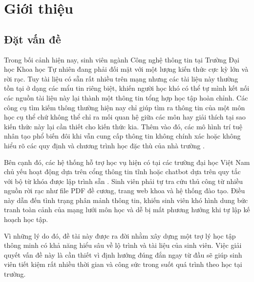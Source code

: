 \chapter{Giới thiệu}
\label{Chapter1}



\section{Đặt vấn đề}

Trong bối cảnh hiện nay, sinh viên ngành Công nghệ thông tin tại Trường Đại học Khoa học Tự nhiên đang phải đối mặt với một lượng kiến thức cực kỳ lớn và rời rạc. Tuy tài liệu có sẵn rất nhiều trên mạng nhưng các tài liệu này thường tồn tại ở dạng các mẩu tin riêng biệt, khiến người học khó có thể tự mình kết nối các nguồn tài liệu này lại thành một thông tin tổng hợp học tập hoàn chỉnh. Các công cụ tìm kiếm thông thường hiện nay chỉ giúp tìm ra thông tin của một môn học cụ thể chứ không thể chỉ ra mối quan hệ giữa các môn hay giải thích tại sao kiến thức này lại cần thiết cho kiến thức kia. Thêm vào đó, các mô hình trí tuệ nhân tạo phổ biến đôi khi vẫn cung cấp thông tin không chính xác hoặc không hiểu rõ các quy định và chương trình học đặc thù của nhà trường \cite{ji2023survey}.

Bên cạnh đó, các hệ thống hỗ trợ học vụ hiện có tại các trường đại học Việt Nam chủ yếu hoạt động dựa trên cổng thông tin tĩnh hoặc chatbot dựa trên quy tắc với bộ từ khóa được lập trình sẵn \cite{zawacki2019systematic}. Sinh viên phải tự tra cứu thủ công từ nhiều nguồn rời rạc như file PDF đề cương, trang web khoa và hệ thống đào tạo. Điều này dẫn đến tình trạng phân mảnh thông tin, khiến sinh viên khó hình dung bức tranh toàn cảnh của mạng lưới môn học và dễ bị mất phương hướng khi tự lập kế hoạch học tập.

Vì những lý do đó, đề tài này được ra đời nhằm xây dựng một trợ lý học tập thông minh có khả năng hiểu sâu về lộ trình và tài liệu của sinh viên. Việc giải quyết vấn đề này là cần thiết vì định hướng đúng đắn ngay từ đầu sẽ giúp sinh viên tiết kiệm rất nhiều thời gian và công sức trong suốt quá trình theo học tại trường.

